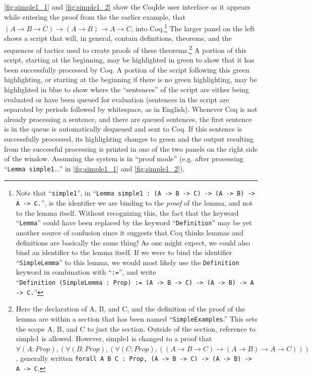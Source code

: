 \documentclass[11pt]{amsart}
\newcommand{\ra}{\ensuremath{\rightarrow}}
\begin{document}
\autoref{fig:simple1_1} and \autoref{fig:simple1_2} show the CoqIde user interface as it appears while entering the proof from the the earlier example, that $(A \ra B \ra C) \ra (A \ra B) \ra A \ra C$,  into Coq.\footnote{Note that ``\texttt{simple1}'', in ``\texttt{Lemma simple1 : (A -> B -> C) -> (A -> B) -> A -> C.}'', is the identifier we are binding to the \textit{proof} of the lemma, and not to the lemma itself.  Without recognizing this, the fact that the keyword ``\texttt{Lemma}'' could have been replaced by the keyword ``\texttt{Definition}'' may be yet another source of confusion since it suggests that Coq thinks lemmas and definitions are basically the same thing!  As one might expect, we could also bind an identifier to the lemma itself.  If we were to bind the identifier ``\texttt{SimpleLemma}'' to this lemma, we would most likely use the \texttt{Definition} keyword in combination with ``\texttt{:=}'', and write \\``\texttt{Definition (SimpleLemma : Prop) := (A -> B -> C) -> (A -> B) -> A -> C.}''}  
The larger panel on the left shows a script that will, in general, contain definitions, theorems, and the sequences of tactics used to create proofs of these theorems.\footnote{Here the declaration of A, B, and C, and the definition of the proof of the lemma are within a section that has been named ``\texttt{SimpleExamples}.''  This sets the scope A, B, and C to just the section.  Outside of the section, reference to simple1 is allowed.  However, simple1 is changed to a proof that $\forall (A : Prop), (\forall (B : Prop), (\forall (C : Prop), ((A \ra B \ra C) \ra (A \ra B) \ra A \ra C)))$, generally written \texttt{forall A B C : Prop, (A -> B -> C) -> (A -> B) -> A -> C}.}
A portion of this script, starting at the beginning, may be highlighted in green to show that it has been successfully processed by Coq. A portion of the script following this green highlighting, or starting at the beginning if there is no green highlighting, may be highlighted in blue to show where the ``sentences'' of the script are either being evaluated or have been queued for evaluation (sentences in the script are separated by periods followed by whitespace, as in English).  Whenever Coq is not already processing a sentence, and there are queued sentences, the first sentence is in the queue is automatically dequeued and sent to Coq.  If this sentence is successfully processed, its highlighting changes to green and the output resulting from the successful processing is printed in one of the two panels on the right side of the window.  Assuming the system is in ``proof mode'' (e.g. after processing ``\texttt{Lemma simple1}...'' in \autoref{fig:simple1_1} and \autoref{fig:simple1_2}),
\end{document}
